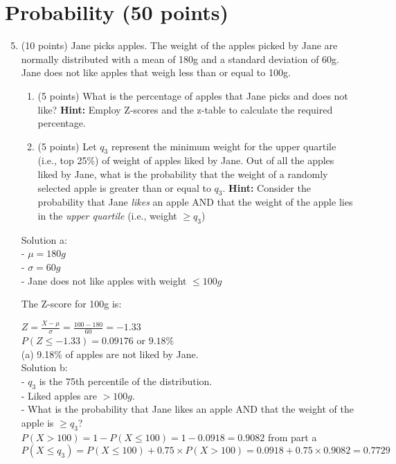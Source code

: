 \documentclass{article}%
\begin{document}
\section*{Probability (50 points)}
\begin{enumerate}
    \setcounter{enumi}{4}
    \item (10 points) Jane picks apples. The weight of the apples picked by Jane are normally distributed with a mean of 180g and a standard deviation of 60g. Jane does not like apples that weigh less than or equal to 100g. 
    \begin{enumerate}
        \item (5 points) What is the percentage of apples that Jane picks and does not like? \textbf{Hint:} Employ Z-scores and the z-table to calculate the required percentage.
        \item (5 points) Let $q_3$ represent the minimum weight for the upper quartile (i.e., top 25\%) of weight of apples  liked by Jane. Out of all the apples liked by Jane, what is the probability that the weight of a randomly selected apple is greater than or equal to $q_3$. \textbf{Hint:} Consider the probability that Jane \emph{likes} an apple AND that the weight of the apple lies in the \emph{upper quartile} (i.e., weight $\geq q_3$)
    \end{enumerate}

    Solution a:\\
    - $\mu = 180g$\\
    - $\sigma = 60g$\\
    - Jane does not like apples with weight $\leq 100g$

    The Z-score for 100g is:

    $Z = \frac{X - \mu}{\sigma} = \frac{100 - 180}{60} = -1.33$ \\
    $P(Z\leq -1.33) = 0.09176$ or $9.18\%$ \\
    
    (a) 9.18\% of apples are not liked by Jane.\\

    Solution b:\\
    - $q_3$ is the 75th percentile of the distribution.\\
    - Liked apples are $> 100g$.\\
    - What is the probability that Jane likes an apple AND that the weight of the apple is $\geq q_3$?\\

    $P(X>100) = 1 - P(X \leq 100) = 1 - 0.0918 = 0.9082$ from part a\\
    $P(X \leq q_3) = P(X \leq 100) + 0.75 \times P(X > 100) = 0.0918 + 0.75 \times 0.9082 = 0.7729$\\


\end{enumerate}
\end{document}

